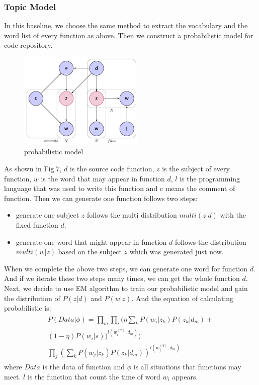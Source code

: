 \subsubsection{Topic Model}
In this baseline, we choose the same method to extract the vocabulary and the word list of every function as above. Then we construct a probabilistic model for code repository.
\begin{figure}[!htp]
 \centering
 \includegraphics[width=6cm]{img/probabilisticModel.pdf}
 \caption{probabilistic model}
\end{figure}
As shown in Fig.7, $d$ is the source code function, $z$ is the subject of every function, $w$ is the word that may appear in function $d$, $l$ is the programming language that was used to write this function and c means the comment of function.
Then we can generate one function follows two steps:
\begin{itemize}
    \item generate one subject $z$ follows the multi distribution $multi(z|d)$ with the fixed function $d$.
    \item generate one word that might appear in function $d$ follows the distribution $multi(w|z)$ based on the subject $z$ which was generated just now.
\end{itemize}
When we complete the above two steps, we can generate one word for function $d$. And if we iterate these two steps many times, we can get the whole function $d$.
Next, we decide to use EM algorithm to train our probabilistic model and gain the distribution of $P(z|d)$ and $P(w|z)$. And the equation of calculating probabilistic is:
\begin{align}
    \begin{split}
        P(Data|\phi)=\prod_{m}\prod_{i}(\eta \sum_{k}P(w_{i}|z_{k})P(z_{k}|d_{m})+\\
        (1-\eta)P(w_{i}|s))^{l(w_{i}^{(x)},d_{m})}) \\
        \prod_{j}(\sum_{k}P(w_{j}|z_{k})P(z_{k}|d_{m}))^{l(w_{j}^{(y)},d_{m})}
    \end{split}
\end{align}
where $Data$ is the data of function and $\phi$ is all situations that functions may meet. $l$ is the function that count the time of word $w_{i}$ appears.

